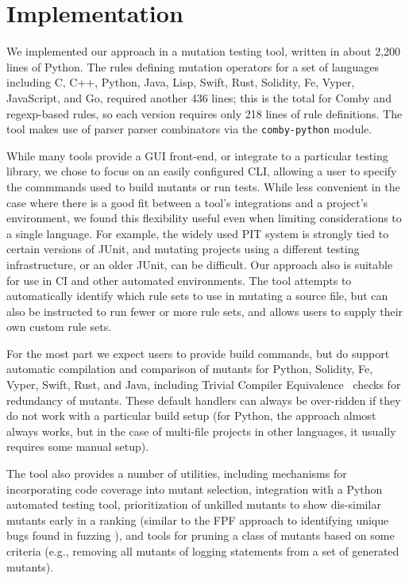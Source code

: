 \documentclass[acmsmall]{acmart}
\begin{document}
{\section{Implementation}
\label{sec:imp}

We implemented our approach in a mutation testing tool, written in
about 2,200 lines of Python.  The rules defining mutation operators
for a set of languages including C, C++, Python, Java, Lisp, Swift,
Rust, Solidity, Fe, Vyper, JavaScript, and Go, required another 436
lines; this is the total for Comby and regexp-based rules, so each
version requires only 218 lines of rule definitions.  The tool makes
use of parser parser combinators via the {\tt comby-python} module.

While many tools provide a GUI front-end, or integrate to a particular
testing library, we chose to focus on an easily configured CLI,
allowing a user to specify the commmands used to build mutants or
run tests.  While less convenient in the case where there is a good
fit between a tool's integrations and a project's environment, we
found this flexibility useful even when limiting considerations to a
single language.  For example, the widely used PIT system is strongly tied to
certain versions of JUnit, and mutating projects using a different
testing infrastructure, or an older JUnit, can be difficult.  Our
approach also is suitable for use in CI and other automated
environments.  The tool attempts to automatically identify which rule sets to use in
mutating a source file, but can also be instructed to run fewer or
more rule sets, and allows users to supply their own custom rule sets.

For the most part we expect users to provide build commands, but do
support automatic compilation and comparison of mutants for Python,
Solidity, Fe, Vyper, Swift, Rust, and Java, including Trivial Compiler
Equivalence~\cite{TCE} checks for redundancy of mutants.  These
default handlers can always be over-ridden if they do not work with a
particular build setup (for Python, the approach almost always works,
but in the case of multi-file projects in other languages, it usually
requires some manual setup).

The tool also provides a number of utilities, including mechanisms for
incorporating code coverage into mutant selection, integration with a
Python automated testing tool, prioritization of unkilled mutants to
show dis-similar mutants early in a ranking (similar to the FPF
approach to identifying unique bugs found in fuzzing
\cite{10.1145/2491956.2462173}), and tools for pruning a class of
mutants based on some criteria (e.g., removing all mutants of logging
statements from a set of generated mutants).

}
\end{document}
